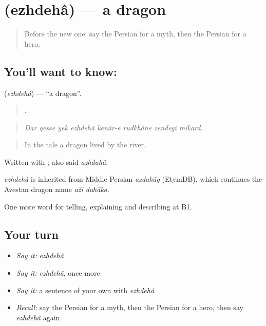 \section[\texorpdfstring{\fa{اژدها} (ezhdehâ)}{اژدها (ezhdehâ)}]{ (ezhdehâ) — a dragon}

\label{lesson:FA-C347-ezhdeha}



\begin{quote}
Before the new one: say the Persian for a myth, then the Persian for a hero.
\end{quote}

\subsection*{You'll want to know: }
\textbf{} (\emph{ezhdehâ}) — \textquotedblleft{}a dragon\textquotedblright{}.

\begin{quote}
       .
\end{quote}

\begin{quote}
\emph{Dar qesse yek ezhdehâ kenâr-e rudkhâne zendegi mikard.}
\end{quote}

\begin{quote}
In the tale a dragon lived by the river.
\end{quote}

Written with ; also said \emph{azhdahâ}.

\begin{cousinweb}
\emph{ezhdehâ} is inherited from Middle Persian \emph{azdahāg} (EtymDB), which continues the Avestan dragon name \emph{aži dahāka}.
\end{cousinweb}

\begin{grammarlens}[title={What you've built}]
One more word for telling, explaining and describing at B1.
\end{grammarlens}

\subsection*{Your turn}
\begin{itemize}
\raggedright
  \item \emph{Say it:} \emph{ezhdehâ}
  \item \emph{Say it:} \emph{ezhdehâ}, once more
  \item \emph{Say it:} a sentence of your own with \emph{ezhdehâ}
  \item \emph{Recall:} say the Persian for a myth, then the Persian for a hero, then say \emph{ezhdehâ} again
\end{itemize}

